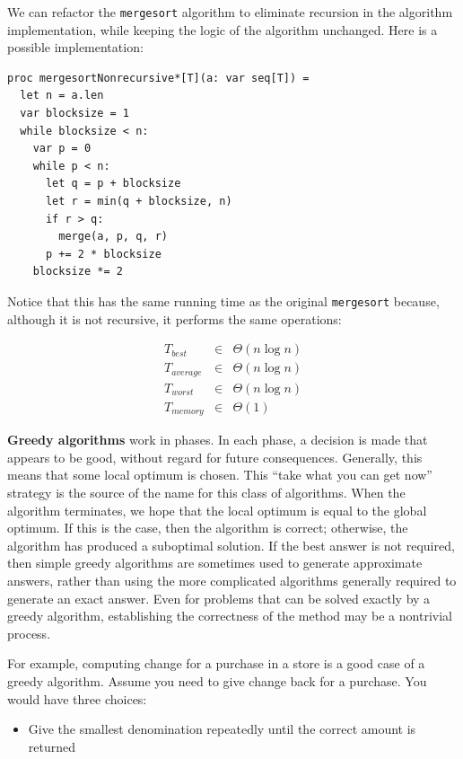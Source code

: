 \documentclass[justified, sixbynine]{tufte-book}
\def\ft{\small\tt}
\theoremstyle{plain}%
\newtheorem * {corollary}{Corollary}
\theoremstyle{definition}
\theoremstyle{remark}
\newtheorem * {remark}{Remark}
\newtheorem * {note}{Note}
\begin{document}
\begin{fullwidth}
We can refactor the {\ft mergesort} algorithm to eliminate recursion in the algorithm implementation, while keeping the logic of the algorithm unchanged. Here is a possible implementation:
\begin{lstlisting}
proc mergesortNonrecursive*[T](a: var seq[T]) =
  let n = a.len
  var blocksize = 1
  while blocksize < n:
    var p = 0
    while p < n:
      let q = p + blocksize
      let r = min(q + blocksize, n)
      if r > q:
        merge(a, p, q, r)
      p += 2 * blocksize
    blocksize *= 2
\end{lstlisting}

Notice that this has the same running time as the original {\ft mergesort} because, although it is not recursive, it performs the same operations:

\begin{eqnarray}
T_{best} &\in &\Theta (n\log n) \\
T_{average} &\in &\Theta (n\log n) \\
T_{worst} &\in &\Theta (n\log n) \\
T_{memory} &\in &\Theta (1)
\end{eqnarray}


{\bf Greedy algorithms}
 work in phases. In each phase, a decision is made
that appears to be good, without regard for future consequences. Generally,
this means that some local optimum is chosen. This ``take what you can get
now'' strategy is the source of the name for this class of algorithms. When
the algorithm terminates, we hope that the local optimum is equal to the
global optimum. If this is the case, then the algorithm is correct;
otherwise, the algorithm has produced a suboptimal solution. If the best
answer is not required, then simple greedy algorithms are sometimes used to
generate approximate answers, rather than using the more complicated
algorithms generally required to generate an exact answer. Even for problems
that can be solved exactly by a greedy algorithm, establishing the
correctness of the method may be a nontrivial process.

For example, computing change for a purchase in a store is a good case of a greedy algorithm.  Assume you need to give change back for a purchase.  You would have three choices:
\begin{itemize}
\item Give the smallest denomination repeatedly until the correct amount is returned


\end{itemize}
\end{fullwidth}
\end{document}
